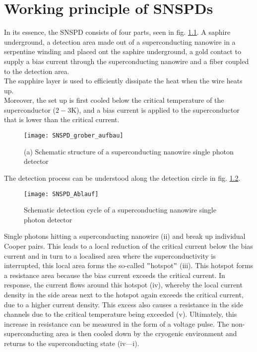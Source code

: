\graphicspath{{/Users/maxim.re/Studium/Physik B.Sc./Semester_8_SS24/Proseminar/Figs Single Photon Detection/}}

\chapter{Working principle of SNSPDs}
\label{sec:SNSPD_working_principle}

In its essence, the SNSPD consists of four parts, seen in fig. \ref{fig:SNSPD_rough_structure}.
A saphire underground, a detection area made out of a superconducting nanowire in a serpentine winding and placed ont the
saphire underground, a gold contact to supply a bias current through the superconducting nanowire and a fiber coupled
to the detection area.\\
The sapphire layer is used to efficiently dissipate the heat when the wire heats up. \\
Moreover, the set up is first cooled below the critical temperature of the superconductor ($2-3 \text{K}$),
and a bias current is applied to the superconductor that is lower than the critical current.

\begin{figure}[hhh]
\texttt{[image: SNSPD\_grober\_aufbau]}
\caption{(a) Schematic structure of a superconducting nanowire single photon detector \cite{steudle-2012}}
\label{fig:SNSPD_rough_structure}
\end{figure}

The detection process can be understood along the detection circle in fig. \ref{fig: SNSPD_process}.

\begin{figure}[hhh]
\texttt{[image: SNSPD\_Ablauf]}
\caption{Schematic detection cycle of a superconducting nanowire single photon detector \cite{singlequantum_snsd_nodate} }
\label{fig: SNSPD_process}
\end{figure}

Single photons hitting a superconducting nanowire (ii) and break up individual Cooper pairs.
This leads to a local reduction of the critical current below the bias current and in turn to a localised area where
the superconductivity is interrupted, this local area forms the so-called \("\)hotspot\("\) (iii).
This hotspot forms a resistance area because the bias current exceeds the critical current.
In response, the current flows around this hotspot (iv), whereby the local current density in the side areas next to the
hotspot again exceeds the critical current, due to a higher current density.
This excess also causes a resistance in the side channels due to the critical temperature being exceeded (v).
Ultimately, this increase in resistance can be measured in the form of a voltage pulse.
The non-superconducting area is then cooled down by the cryogenic environment and returns to the superconducting state
(iv—i).\\

